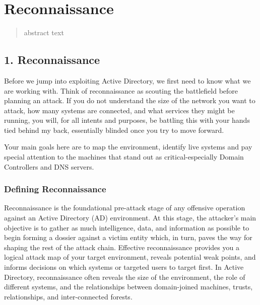 %
%
%

\label{intro} %


\chapter{Reconnaissance}
\begin{abstract}
    abstract text
\end{abstract}
\section{1. Reconnaissance}
Before we jump into exploiting Active Directory, we first need to know what we are working with. Think of reconnaissance as scouting the battlefield before planning an attack. If you do not understand the size of the network you want to attack, how many systems are connected, and what services they might be running, you will, for all intents and purposes, be battling this with your hands tied behind my back, essentially blinded once you try to move forward.

Your main goals here are to map the environment, identify live systems and pay special attention to the machines that stand out as critical-especially Domain Controllers and DNS servers.

\subsection{Defining Reconnaissance}
Reconnaissance is the foundational pre-attack stage of any offensive operation against an Active Directory (AD) environment. At this stage, the attacker's main objective is to gather as much intelligence, data, and information as possible to begin forming a dossier against a victim entity which, in turn, paves the way for shaping the rest of the attack chain. Effective reconnaissance provides you a logical attack map of your target environment, reveals potential weak points, and informs decisions on which systems or targeted users to target first. In Active Directory, reconnaissance often reveals the size of the environment, the role of different systems, and the relationships between domain-joined machines, trusts, relationships, and inter-connected forests.

